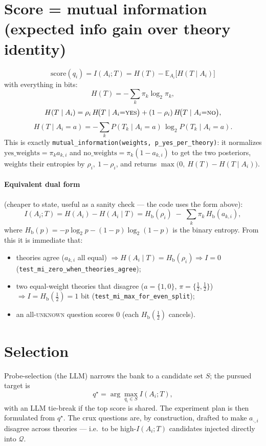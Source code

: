 \documentclass[11pt]{article}
\newcommand{\YES}{\textsc{yes}}
\newcommand{\NO}{\textsc{no}}
\newcommand{\UNK}{\textsc{unknown}}
\newcommand{\Hb}{H_{\mathrm{b}}}
\begin{document}
\section{Score = mutual information (expected info gain over theory identity)}

\[
\boxed{\;\text{score}(q_i) = I(A_i; T) = H(T) - \mathbb{E}_{A_i}\!\big[H(T \mid A_i)\big]\;}
\]
with everything in bits:
\[
H(T) = -\sum_k \pi_k \log_2 \pi_k,
\]
\[
H(T \mid A_i) = \rho_i\, H\!\big(T \mid A_i{=}\YES\big)
+ (1 - \rho_i)\, H\!\big(T \mid A_i{=}\NO\big),
\]
\[
H(T \mid A_i{=}a) = -\sum_k P(T_k \mid A_i{=}a)\,\log_2 P(T_k \mid A_i{=}a).
\]
This is exactly \texttt{mutual\_information(weights, p\_yes\_per\_theory)}: it
normalizes $\text{yes\_weights} = \pi_k a_{k,i}$ and
$\text{no\_weights} = \pi_k(1 - a_{k,i})$ to get the two posteriors, weights
their entropies by $\rho_i,\ 1-\rho_i$, and returns
$\max\big(0,\ H(T) - H(T \mid A_i)\big)$.

\paragraph{Equivalent dual form} (cheaper to state, useful as a sanity check ---
the code uses the form above):
\[
I(A_i; T) = H(A_i) - H(A_i \mid T)
= \Hb(\rho_i) \;-\; \sum_k \pi_k\, \Hb(a_{k,i}),
\]
where $\Hb(p) = -p\log_2 p - (1-p)\log_2(1-p)$ is the binary entropy. From this
it is immediate that:
\begin{itemize}[nosep]
  \item theories agree ($a_{k,i}$ all equal) $\Rightarrow H(A_i \mid T) = \Hb(\rho_i)
        \Rightarrow I = 0$ (\texttt{test\_mi\_zero\_when\_theories\_agree});
  \item two equal-weight theories that disagree ($a = \{1,0\}$,
        $\pi = \{\tfrac12,\tfrac12\}$) $\Rightarrow I = \Hb(\tfrac12) = 1$ bit
        (\texttt{test\_mi\_max\_for\_even\_split});
  \item an all-\UNK{} question scores $0$ (each $\Hb(\tfrac12)$ cancels).
\end{itemize}

\section{Selection}

Probe-selection (the LLM) narrows the bank to a candidate set $S$; the pursued
target is
\[
q^\star = \arg\max_{q_i \in S} I(A_i; T),
\]
with an LLM tie-break if the top score is shared. The experiment plan is then
formulated from $q^\star$. The crux questions are, by construction, drafted to
make $a_{\cdot,i}$ disagree across theories --- i.e.\ to be high-$I(A_i; T)$
candidates injected directly into $\mathcal{Q}$.
\end{document}
